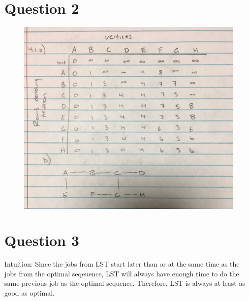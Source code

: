 \documentclass[11pt, oneside]{article}
\begin{document}
\clearpage

\section{Question 2}
\begin{figure}[ht]
\begin{center}
\includegraphics[width=\linewidth]{unnamed.jpg}
\end{center}
\end{figure}
\clearpage

\section{Question 3}

Intuition: Since the jobs from LST start later than or at the same time as the jobs from the optimal seqeuence, LST will always have enough time to do the same previous job as the optimal sequence. Therefore, LST is always at least as good as optimal. \newline
\end{document}
